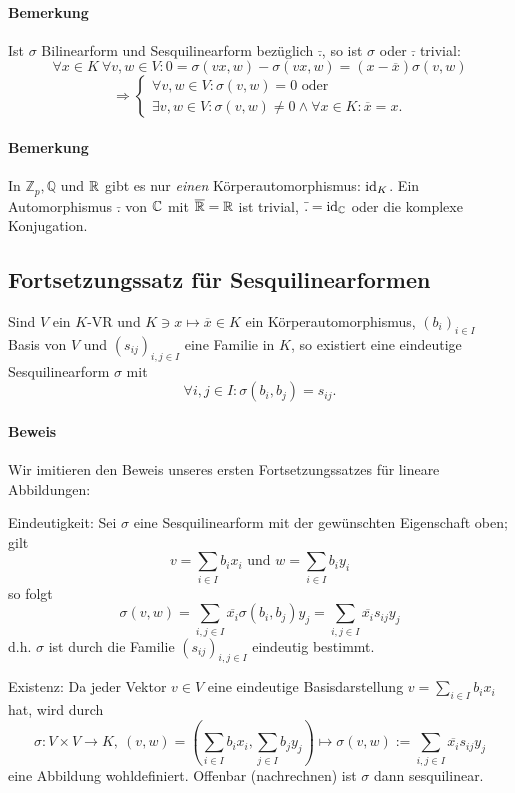 \paragraph{Bemerkung}
	Ist $ \sigma $ Bilinearform und Sesquilinearform bezüglich $ \bar{.} $, so ist $ \sigma $ oder $ \bar{.} $ trivial:
		\[ \forall x\in K\ \forall v,w\in V: 0 = \sigma(vx,w) - \sigma(vx,w) = (x-\overline{x})\sigma(v,w)  \]
		\[ \Rightarrow \begin{cases}
		\forall v,w\in V: \sigma(v,w) = 0 \text{ oder}\\
		\exists v,w\in V: \sigma(v,w)\neq 0 \land \forall x\in K: \overline{x} = x.
		\end{cases} \]
\paragraph{Bemerkung}
	In $ \mathbb{Z}_p, \mathbb{Q} $ und $ \mathbb{R} $ gibt es nur \emph{einen} Körperautomorphismus: $ \operatorname{id}_K $. Ein Automorphismus $ \bar{.} $ von $ \mathbb{C} $ mit $ \overline{\mathbb{R}} = \mathbb{R} $ ist trivial, $ \bar{.} = \operatorname{id}_{\mathbb{C}} $ oder die komplexe Konjugation.
	
\subsection{Fortsetzungssatz für Sesquilinearformen}
\begin{Satz}
	Sind $ V $ ein $ K $-VR und $ K\ni x\mapsto \overline{x}\in K $ ein Körperautomorphismus, $ (b_i)_{i\in I} $ Basis von $ V $ und $ (s_{ij})_{i,j\in I} $ eine Familie in $ K $, so existiert eine eindeutige Sesquilinearform $ \sigma $ mit
		\[ \forall i,j\in I:\sigma(b_i,b_j) = s_{ij}. \]
\end{Satz}

\paragraph{Beweis}
	Wir imitieren den Beweis unseres ersten Fortsetzungssatzes für lineare Abbildungen:
	
	{Eindeutigkeit:}
	Sei $ \sigma $ eine Sesquilinearform mit der gewünschten Eigenschaft oben; gilt
		\[ v = \sum_{i\in I}b_ix_i \text{ und }w = \sum_{i\in I}b_i y_i \]
	so folgt
		\[ \sigma(v,w) = \sum_{i,j\in I}\overline{x_i}\sigma(b_i,b_j)y_j = \sum_{i,j\in I}\overline{x_i}s_{ij}y_j \]
	d.h. $ \sigma $ ist durch die Familie $ (s_{ij})_{i,j\in I} $ eindeutig bestimmt.
	
	{Existenz:}
	Da jeder Vektor $ v\in V $ eine eindeutige Basisdarstellung $ v=\sum_{i\in I}b_ix_i $ hat, wird durch
	\[ \sigma:V\times V \to K,\ (v,w)= \left(\sum_{i\in I}b_ix_i, \sum_{j\in I}b_jy_j\right) \mapsto \sigma(v,w) := \sum_{i,j\in I}\overline{x_i}s_{ij}y_j \]
	eine Abbildung wohldefiniert. Offenbar (nachrechnen) ist $ \sigma $ dann sesquilinear. 

